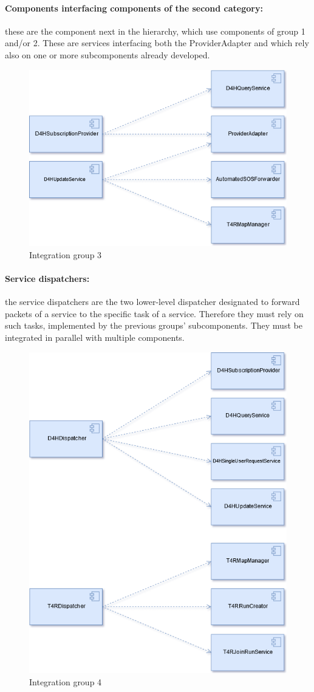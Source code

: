 \paragraph{Components interfacing components of the second category:} these are the component next in the hierarchy, which use components of group 1 and/or 2.  These are services interfacing both the ProviderAdapter and which rely also on one or more subcomponents already developed.
\begin{figure}[H]
    \includegraphics[width=.7\linewidth, keepaspectratio]{./Images/Section5/integration_g3.png}
    \centering
    \caption{Integration group 3}
    \label{fig:intg3}
 \end{figure}

\newpage
\paragraph[H]{Service dispatchers:} the service dispatchers are the two lower-level dispatcher designated to forward packets of a service to the specific task of a service. Therefore they must rely on such tasks, implemented by the previous groups' subcomponents. They must be integrated in parallel with multiple components.
\begin{figure}[H]
    \includegraphics[width=.7\linewidth, keepaspectratio]{./Images/Section5/integration_g4.png}
    \centering
    \caption{Integration group 4}
    \label{fig:intg4}
 \end{figure}

